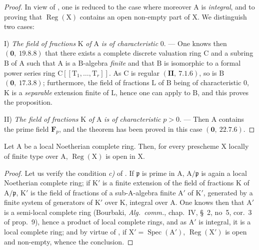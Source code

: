 \begin{proof}
In view of , one is reduced to the case where moreover $\mathrm{A}$ is \emph{integral}, and to
proving that $\operatorname{Reg}(\mathrm{X})$ contains an open non-empty part of $\mathrm{X}$. We distinguish
two cases:


I) \emph{The field of fractions} $\mathrm{K}$ \emph{of} $\mathrm{A}$ \emph{is of characteristic} $0$. --- One knows then $(\mathbf{0},~19.8.8)$
that there exists a complete discrete valuation ring $\mathrm{C}$ and a subring $\mathrm{B}$ of $\mathrm{A}$ such
that $\mathrm{A}$ is a $\mathrm{B}$-algebra \emph{finite} and that $\mathrm{B}$ is isomorphic to a formal power series ring
$\mathrm{C}[[\mathrm{T}_1,\ldots,\mathrm{T}_r]]$. As $\mathrm{C}$ is regular $(\mathbf{II},~7.1.6)$, so is $\mathrm{B}$ $(\mathbf{0},~17.3.8)$;
furthermore, the field of fractions $\mathrm{L}$ of $\mathrm{B}$ being of characteristic $0$, $\mathrm{K}$ is a \emph{separable} extension
finite of $\mathrm{L}$, hence one can apply  to $\mathrm{B}$, and this proves the
proposition.

II) \emph{The field of fractions} $\mathrm{K}$ \emph{of} $\mathrm{A}$ \emph{is of characteristic} $p>0$. --- Then $\mathrm{A}$ contains the
prime field $\mathbf{F}_p$, and the theorem has been proved in this case $(\mathbf{0},~22.7.6)$.
\end{proof}

\begin{corollary}[6.12.8]
\label{IV.6.12.8}
Let $\mathrm{A}$ be a local Noetherian complete ring. Then, for every
prescheme $\mathrm{X}$ locally of finite type over $\mathrm{A}$, $\operatorname{Reg}(\mathrm{X})$ is open in $\mathrm{X}$.
\end{corollary}

\begin{proof}
Let us verify the condition \emph{c)} of . If $\mathfrak{p}$ is prime in $\mathrm{A}$, $\mathrm{A}/\mathfrak{p}$ is again a
local Noetherian complete ring; if $\mathrm{K}'$ is a finite extension of the field of fractions $\mathrm{K}$
of $\mathrm{A}/\mathfrak{p}$, $\mathrm{K}'$ is the field of fractions of a sub-$\mathrm{A}$-algebra finite $\mathrm{A}'$ of $\mathrm{K}'$, generated by
a finite system of generators of $\mathrm{K}'$ over $\mathrm{K}$, integral over $\mathrm{A}$. One knows then that $\mathrm{A}'$ is a
semi-local complete ring (Bourbaki, \emph{Alg.~comm.}, chap.~IV, \S~2, no~5, cor.~3 of prop.~9), hence
a product of local complete rings, and as $\mathrm{A}'$ is integral, it is a local
complete ring; and by virtue of , if $\mathrm{X}'=\operatorname{Spec}(\mathrm{A}')$, $\operatorname{Reg}(\mathrm{X}')$ is open and non-empty,
whence the conclusion.
\end{proof}

